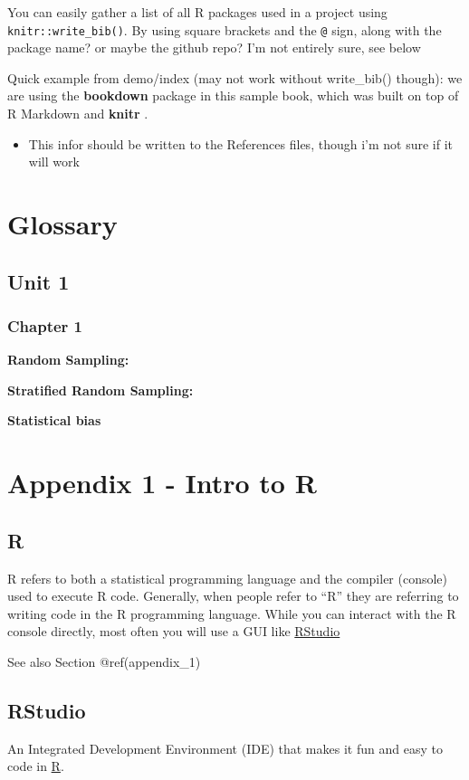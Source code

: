 \documentclass[
]{book}
\providecommand{\tightlist}{%
  \setlength{\itemsep}{0pt}\setlength{\parskip}{0pt}}
\begin{document}
You can easily gather a list of all R packages used in a project using \texttt{knitr::write\_bib()}.
By using square brackets and the \texttt{@} sign, along with the package name? or maybe the github repo? I'm not entirely sure, see below

Quick example from demo/index (may not work without write\_bib() though):
we are using the \textbf{bookdown} package \citep{R-bookdown} in this sample book,
which was built on top of R Markdown and \textbf{knitr} \citep{xie2015}.

\begin{itemize}
\tightlist
\item
  This infor should be written to the References files, though i'm not sure if it will work
\end{itemize}

\hypertarget{glossary-1}{%
\chapter{Glossary}\label{glossary-1}}

\hypertarget{unit-1}{%
\section{Unit 1}\label{unit-1}}

\hypertarget{chapter-1}{%
\subsection{Chapter 1}\label{chapter-1}}

\textbf{Random Sampling:}

\textbf{Stratified Random Sampling:}

\textbf{Statistical bias}

\hypertarget{appendix-1---intro-to-r}{%
\chapter{Appendix 1 - Intro to R}\label{appendix-1---intro-to-r}}

\hypertarget{glossary_r}{%
\section{R}\label{glossary_r}}

R refers to both a statistical programming language and the compiler (console) used to execute R code. Generally, when people refer to ``R'' they are referring to writing code in the R programming language. While you can interact with the R console directly, most often you will use a GUI like \protect\hyperlink{glossary_rstudio}{RStudio}

See also Section @ref(appendix\_1)

\hypertarget{glossary_rstudio}{%
\section{RStudio}\label{glossary_rstudio}}

An Integrated Development Environment (IDE) that makes it fun and easy to code in \protect\hyperlink{glossary_r}{R}.

  
\end{document}
